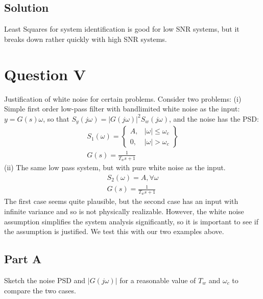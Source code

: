 \documentclass{article}
\begin{document}
\subsection*{Solution}
Least Squares for system identification is good for low SNR systems, but it breaks down rather quickly with high SNR systems.

\section*{Question V}
Justification of white noise for certain problems. Consider two problems: (i) Simple first order low-pass filter with bandlimited white noise as the input:\\
$y = G(s)\omega$, so that $S_y(j\omega) = |G(j\omega)|^2 S_w(j\omega)$, and the noise has the PSD:
\begin{gather*}
    S_1(\omega) = \left\{
                    \begin{array}{lr}
                        A, & |\omega|\leq\omega_c\\
                        0, & |\omega|>\omega_c
                    \end{array}
                \right\}\\
    G(s)=\frac{1}{T_ws+1}
\end{gather*}
(ii) The same low pass system, but with pure white noise as the input.
\begin{gather*}
    S_2(\omega)=A,\forall\omega\\
    G(s)=\frac{1}{T_ws+1}
\end{gather*}
The first case seems quite plausible, but the second case has an input with infinite variance and so is not physically realizable.  However, the white noise 
assumption simplifies the system analysis significantly, so it is important to see if the assumption is justified.  We test this with our two examples above.
\subsection*{Part A}
Sketch the noise PSD and $|G(j\omega)|$ for a reasonable value of $T_w$ and $\omega_c$ to compare the two cases.
\end{document}
